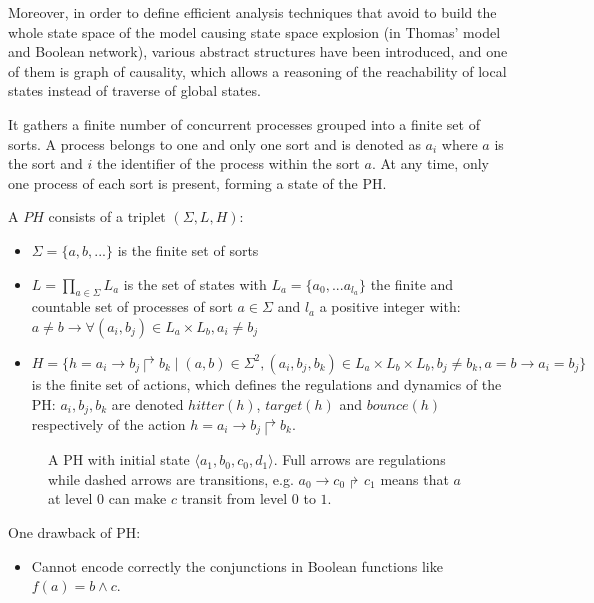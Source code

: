 Moreover, in order to define efficient analysis techniques that avoid to build the whole state space of the model causing state space explosion (in Thomas' model and Boolean network), various abstract structures have been introduced, and one of them is graph of causality, which allows a reasoning of the reachability of local states instead of traverse of global states.

It gathers a finite number of concurrent processes grouped into a finite set of sorts. A process belongs to one and only one sort and is denoted as $a_i$ where $a$ is the sort and $i$ the identifier of the process within the sort $a$.
At any time, only one process of each sort is present, forming a state of the PH.

\begin{definition}
A $PH$ consists of a triplet $(\Sigma, L, H)$:
\begin{itemize}
    \item $\Sigma=\{a,b,...\}$ is the finite set of sorts
    \item $L=\prod_{a\in\Sigma}{L_a}$ is the set of states with $L_a=\{a_0,...a_{l_a}\}$ the finite and countable set of processes of sort $a\in\Sigma$ and $l_a$ a positive integer with: $a\neq b\to \forall(a_i,b_j)\in L_a\times L_b,a_i\neq b_j$
    \item $H=\{h=a_i\to b_j\Rsh b_k\mid(a,b)\in\Sigma^2, (a_i,b_j,b_k)\in L_a\times L_b\times L_b,b_j\neq b_k, a=b\to a_i=b_j\}$ is the finite set of actions, which defines the regulations and dynamics of the PH: $a_i, b_j, b_k$ are denoted $hitter(h)$, $target(h)$ and $bounce(h)$ respectively of the action $h=a_i\to b_j\Rsh b_k$.
\end{itemize}
\end{definition}

\begin{figure}[ht]
\centering

\caption[Process Hitting]{A PH with initial state $\langle a_1,b_0,c_0,d_1\rangle$.
Full arrows are regulations while dashed arrows are transitions, e.g. $a_0\to c_0\Rsh c_1$  means that $a$ at level $0$ can make $c$ transit from level $0$ to $1$.}\label{fig:PH}
\end{figure}

One drawback of PH: 

\begin{itemize}
    \item Cannot encode correctly the conjunctions in Boolean functions like $f(a)=b\land c$.
\end{itemize}

